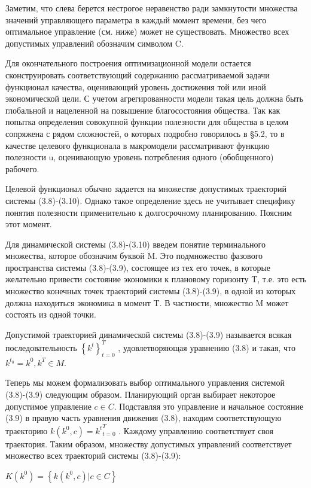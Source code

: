\documentclass[12pt, 4paper]{book}
\begin{document}
{Заметим, что слева берется нестрогое неравенство ради замкнутости множества значений управляющего параметра в каждый момент времени, без чего оптимальное управление (см. ниже) может не существовать. Множество всех допустимых управлений обозначим символом C.
\par

Для окончательного построения оптимизационной модели остается сконструировать соответствующий содержанию рассматриваемой задачи функционал качества, оценивающий уровень достижения той или иной экономической цели. С учетом агрегированности модели такая цель должна быть глобальной и нацеленной на повышение благосостояния общества. Так как попытка определения совокупной функции полезности для общества в целом сопряжена с рядом сложностей, о которых подробно говорилось в §5.2, то в качестве целевого функционала в макромодели рассматривают функцию полезности u, оценивающую уровень потребления одного (обобщенного) рабочего.
\par

Целевой функционал обычно задается на множестве допустимых траекторий системы (3.8)-(3.10). Однако такое определение здесь не учитывает специфику понятия полезности применительно к долгосрочному планированию. Поясним этот момент.
\par

Для динамической системы (3.8)-(3.10) введем понятие терминального множества, которое обозначим буквой M. Это подмножество фазового пространства  системы (3.8)-(3.9), состоящее из тех его точек, в которые желательно привести состояние экономики к плановому горизонту T, т.е. это есть множество конечных точек траекторий системы (3.8)-(3.9), в одной из которых должна находиться экономика в момент T. В частности, множество M может состоять из одной точки.
\par

Допустимой траекторией динамической системы (3.8)-(3.9) называется всякая последовательность $\left\{k^t\right\}_{t=0}^T$ , удовлетворяющая уравнению (3.8) и такая, что $k^{t_0}=k^0, k^T \in M$.
\par

Теперь мы можем формализовать выбор оптимального управления системой (3.8)-(3.9) следующим образом. Планирующий орган выбирает некоторое допустимое управление $c \in C$. Подставляя это управление и начальное состояние (3.9) в правую часть уравнения движения (3.8), находим соответствующую траекторию $k(k^0,c)={k^t}_{t=0}^T$ . Каждому управлению соответствует своя траектория. Таким образом, множеству допустимых управлений соответствует множество всех траекторий системы (3.8)-(3.9):
\begin{center}
$K(k^0) = \left\{k(k^0,c)| c \in C\right\}$
\end{center}
\par

}
\end{document}
